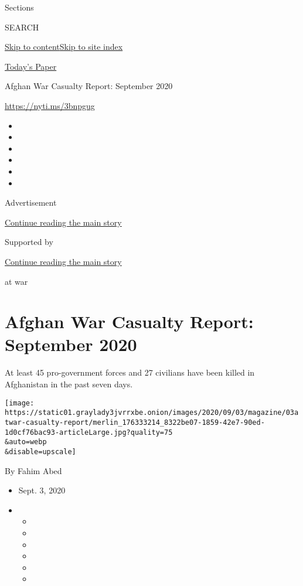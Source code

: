 Sections

SEARCH

\protect\hyperlink{site-content}{Skip to
content}\protect\hyperlink{site-index}{Skip to site index}

\href{https://myaccount.nytimes3xbfgragh.onion/auth/login?response_type=cookie\&client_id=vi}{}

\href{https://www.nytimes3xbfgragh.onion/section/todayspaper}{Today's
Paper}

Afghan War Casualty Report: September 2020

\url{https://nyti.ms/3bnpgug}

\begin{itemize}
\item
\item
\item
\item
\item
\item
\end{itemize}

Advertisement

\protect\hyperlink{after-top}{Continue reading the main story}

Supported by

\protect\hyperlink{after-sponsor}{Continue reading the main story}

at war

\hypertarget{afghan-war-casualty-report-september-2020}{%
\section{Afghan War Casualty Report: September
2020}\label{afghan-war-casualty-report-september-2020}}

At least 45 pro-government forces and 27 civilians have been killed in
Afghanistan in the past seven days.

\texttt{[image: https://static01.graylady3jvrrxbe.onion/images/2020/09/03/magazine/03atwar-casualty-report/merlin\_176333214\_8322be07-1859-42e7-90ed-1d0cf76bac93-articleLarge.jpg?quality=75\\\&auto=webp\\\&disable=upscale]}

By Fahim Abed

\begin{itemize}
\item
  Sept. 3, 2020
\item
  \begin{itemize}
  \item
  \item
  \item
  \item
  \item
  \item
  \end{itemize}
\end{itemize}

